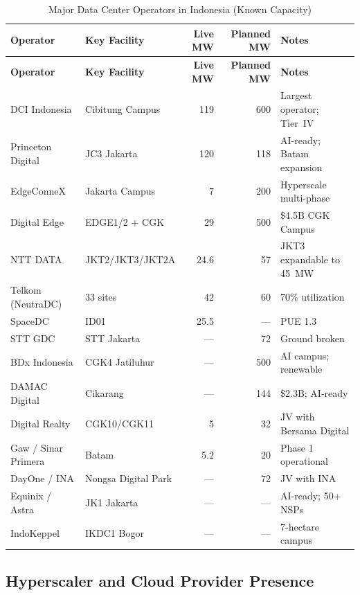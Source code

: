 \documentclass[11pt,a4paper]{article}
\begin{document}
\begin{longtable}{p{3.8cm}p{3.5cm}rrp{3cm}}
\caption{Major Data Center Operators in Indonesia (Known Capacity)} \\
\toprule
\textbf{Operator} & \textbf{Key Facility} & \textbf{Live MW} & \textbf{Planned MW} & \textbf{Notes} \\
\midrule
\endfirsthead
\toprule
\textbf{Operator} & \textbf{Key Facility} & \textbf{Live MW} & \textbf{Planned MW} & \textbf{Notes} \\
\midrule
\endhead
\bottomrule
\endfoot

DCI Indonesia         & Cibitung Campus    & 119  & 600  & Largest operator; Tier~IV \\
Princeton Digital     & JC3 Jakarta        & 120  & 118  & AI-ready; Batam expansion \\
EdgeConneX            & Jakarta Campus     & 7    & 200  & Hyperscale multi-phase \\
Digital Edge          & EDGE1/2 + CGK      & 29   & 500  & \$4.5B CGK Campus \\
NTT DATA              & JKT2/JKT3/JKT2A   & 24.6 & 57   & JKT3 expandable to 45~MW \\
Telkom (NeutraDC)     & 33 sites           & 42   & 60   & 70\% utilization \\
SpaceDC               & ID01               & 25.5 & ---  & PUE 1.3 \\
STT GDC               & STT Jakarta        & ---  & 72   & Ground broken \\
BDx Indonesia         & CGK4 Jatiluhur     & ---  & 500  & AI campus; renewable \\
DAMAC Digital         & Cikarang           & ---  & 144  & \$2.3B; AI-ready \\
Digital Realty        & CGK10/CGK11        & 5    & 32   & JV with Bersama Digital \\
Gaw / Sinar Primera  & Batam              & 5.2  & 20   & Phase 1 operational \\
DayOne / INA          & Nongsa Digital Park& ---  & 72   & JV with INA \\
Equinix / Astra      & JK1 Jakarta        & ---  & ---  & AI-ready; 50+ NSPs \\
IndoKeppel            & IKDC1 Bogor        & ---  & ---  & 7-hectare campus \\
\end{longtable}

\subsection{Hyperscaler and Cloud Provider Presence}
\end{document}
